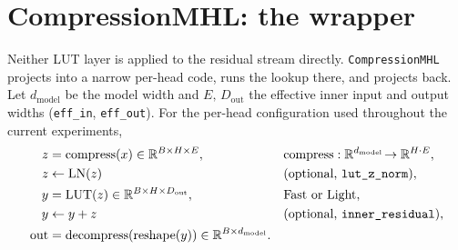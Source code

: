 \documentclass[11pt]{article}
\begin{document}
\section{CompressionMHL: the wrapper}

Neither LUT layer is applied to the residual stream directly. \texttt{CompressionMHL}
projects into a narrow per-head code, runs the lookup there, and projects back. Let
$d_{\text{model}}$ be the model width and $E,\,D_{\text{out}}$ the effective inner input
and output widths (\texttt{eff\_in}, \texttt{eff\_out}). For the per-head configuration
used throughout the current experiments,
\begin{align}
  z &= \mathrm{compress}(x) \in \mathbb{R}^{B\times H\times E},
     &&\mathrm{compress}: \mathbb{R}^{d_{\text{model}}}\!\to\mathbb{R}^{H\cdot E},
     \label{eq:compress}\\
  z &\leftarrow \mathrm{LN}(z) &&\text{(optional, \texttt{lut\_z\_norm})},
     \label{eq:znorm}\\
  y &= \mathrm{LUT}(z) \in \mathbb{R}^{B\times H\times D_{\text{out}}},
     &&\text{Fast or Light},\\
  y &\leftarrow y + z &&\text{(optional, \texttt{inner\_residual})},
     \label{eq:innerres}\\
  \text{out} &= \mathrm{decompress}\!\left(\mathrm{reshape}(y)\right)
     \in \mathbb{R}^{B\times d_{\text{model}}} .
\end{align}
\end{document}
